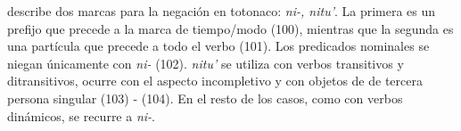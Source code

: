 \textcolor{MidnightBlue}{\citet{Totonaco}} describe dos marcas para la negación en totonaco: {\setmainfont{Charis SIL} \textit{ni-, nitu'}}. La primera es un prefijo que precede a la marca de tiempo/modo (100), mientras que la segunda es una partícula que precede a todo el verbo (101). Los predicados nominales se niegan únicamente con {\setmainfont{Charis SIL} \textit{ni-}} (102). {\setmainfont{Charis SIL} \textit{nitu'}} se utiliza con verbos transitivos y ditransitivos, ocurre con el aspecto incompletivo y con objetos de de tercera persona singular (103) - (104). En el resto de los casos, como con verbos dinámicos, se recurre a {\setmainfont{Charis SIL} \textit{ni-}}.